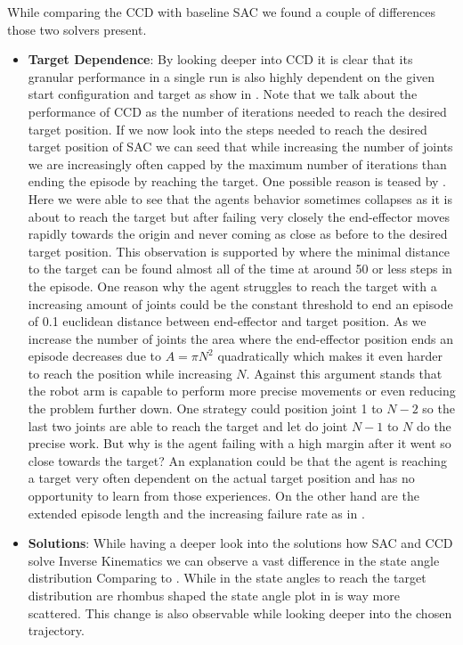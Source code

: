 While comparing the CCD with baseline SAC we found a couple of differences those two solvers present.
\begin{itemize}
    \item \textbf{Target Dependence}: By looking deeper into CCD it is clear that its granular performance in a single run is also highly dependent on the given start configuration and target as show in . Note that we talk about the performance of CCD as the number of iterations needed to reach the desired target position. If we now look into the steps needed to reach the desired target position of SAC we can seed that while increasing the number of joints we are increasingly often capped by the maximum number of iterations than ending the episode by reaching the target. One possible reason is teased by . Here we were able to see that the agents behavior sometimes collapses as it is about to reach the target but after failing very closely the end-effector moves rapidly towards the origin and never coming as close as before to the desired target position. This observation is supported by  where the minimal distance to the target can be found almost all of the time at around 50 or less steps in the episode. One reason why the agent struggles to reach the target with a increasing amount of joints could be the constant threshold to end an episode of 0.1 euclidean distance between end-effector and target position. As we increase the number of joints the area where the end-effector position ends an episode decreases due to $A = \pi N^2$ quadratically which makes it even harder to reach the position while increasing $N$. Against this argument stands that the robot arm is capable to perform more precise movements or even reducing the problem further down. One strategy could position joint 1 to $N - 2$ so the last two joints are able to reach the target and let do joint $N - 1$ to $N$ do the precise work. But why is the agent failing with a high margin after it went so close towards the target? An explanation could be that the agent is reaching a target very often dependent on the actual target position and has no opportunity to learn from those experiences. On the other hand are the  extended episode length and the increasing failure rate as in .
    \item \textbf{Solutions}: While having a deeper look into the solutions how SAC and CCD solve Inverse Kinematics we can observe a vast difference in the state angle distribution Comparing  to . While in  the state angles to reach the target distribution are rhombus shaped the state angle plot in  is way more scattered. This change is also observable while looking deeper into the chosen trajectory. 
\end{itemize}

